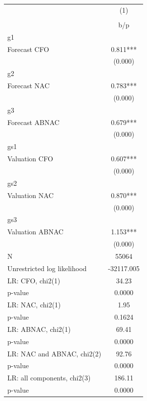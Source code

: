 {
\def\sym#1{\ifmmode^{#1}\else\(^{#1}\)\fi}
\begin{tabular}{l*{1}{c}}
\hline\hline
                    &\multicolumn{1}{c}{(1)}\\
                    &\multicolumn{1}{c}{}\\
                    &         b/p   \\
\hline
g1                  &               \\
Forecast CFO        &       0.811***\\
                    &     (0.000)   \\
\hline
g2                  &               \\
Forecast NAC        &       0.783***\\
                    &     (0.000)   \\
\hline
g3                  &               \\
Forecast ABNAC      &       0.679***\\
                    &     (0.000)   \\
\hline
gs1                 &               \\
Valuation CFO       &       0.607***\\
                    &     (0.000)   \\
\hline
gs2                 &               \\
Valuation NAC       &       0.870***\\
                    &     (0.000)   \\
\hline
gs3                 &               \\
Valuation ABNAC     &       1.153***\\
                    &     (0.000)   \\
\hline
N                   &       55064   \\
Unrestricted log likelihood&  -32117.005   \\
LR: CFO, chi2(1)    &       34.23   \\
p-value             &      0.0000   \\
LR: NAC, chi2(1)    &        1.95   \\
p-value             &      0.1624   \\
LR: ABNAC, chi2(1)  &       69.41   \\
p-value             &      0.0000   \\
LR: NAC and ABNAC, chi2(2)&       92.76   \\
p-value             &      0.0000   \\
LR: all components, chi2(3)&      186.11   \\
p-value             &      0.0000   \\
\hline\hline
\end{tabular}
}
